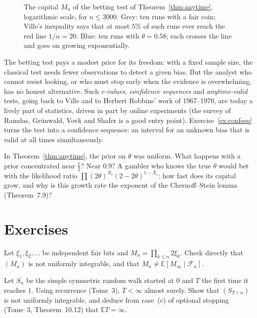 \begin{figure}[ht]
\centering{}
\caption{The capital $M_n$ of the betting test of Theorem~\ref{thm:anytime}, logarithmic scale, for $n\le3000$. Grey: ten runs with a fair coin; Ville's inequality says that at most $5\%$ of such runs ever reach the
red line $1/\alpha=20$. Blue: ten runs with $\theta=0.58$; each crosses the line and goes on growing exponentially.}
\label{fig:ville}
\end{figure}

The betting test pays a modest price for its freedom: with a fixed sample size, the classical test needs fewer observations to detect a given bias. But the analyst who cannot resist looking, or who must
stop early when the evidence is overwhelming, has no honest alternative. Such \emph{e-values}, \emph{confidence sequences} and \emph{anytime-valid} tests, going back to Ville and to Herbert Robbins'
work of 1967--1970, are today a lively part of statistics, driven in part by online experiments (the survey of Ramdas, Gr\"unwald, Vovk and Shafer is a good entry point). Exercise~\ref{ex:confseq} turns the test into a confidence sequence: an interval for an unknown
bias that is valid at all times simultaneously.

\begin{think}
In Theorem~\ref{thm:anytime}, the prior on $\theta$ was uniform. What happens with a prior concentrated near $\frac12$? Near $0.9$? A gambler who knows the true $\theta$ would bet with the likelihood ratio
$\prod(2\theta)^{X_i}(2-2\theta)^{1-X_i}$: how fast does its capital grow, and why is this growth rate the exponent of the Chernoff--Stein lemma (Theorem~7.9)?
\end{think}

\section{Exercises}

\begin{exercise}[$\star$]\label{ex:doubling}
Let $\xi_1,\xi_2,\dots$ be independent fair bits and $M_n=\prod_{k\le n}2\xi_k$. Check directly that $(M_n)$ is not uniformly integrable, and that $M_n\neq\mathbb E[M_\infty\mid\mathcal F_n]$.
\end{exercise}

\begin{exercise}[$\star$]\label{ex:symwalk}
Let $S_n$ be the simple symmetric random walk started at $0$ and $T$ the first time it reaches $1$. Using recurrence (Tome~3), $T<\infty$ almost surely. Show that $(S_{T\wedge n})$ is not uniformly integrable,
and deduce from case~(c) of optional stopping (Tome~3, Theorem~10.12) that $\mathbb ET=\infty$.
\end{exercise}

